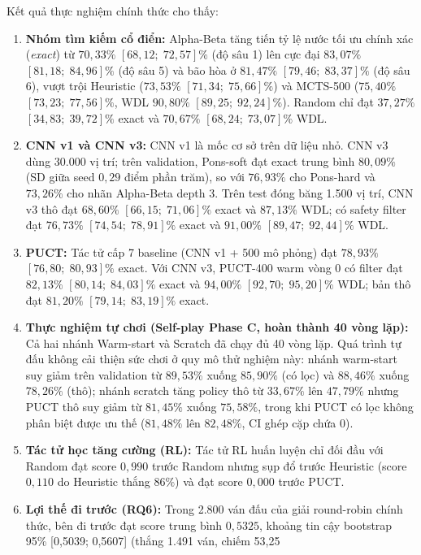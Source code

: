 \documentclass[11pt, a4paper]{article}
\begin{document}
Kết quả thực nghiệm chính thức cho thấy:
\begin{enumerate}
    \item \textbf{Nhóm tìm kiếm cổ điển:} Alpha-Beta tăng tiến tỷ lệ nước tối ưu chính xác (\textit{exact}) từ $70{,}33\%$ $[68{,}12;\; 72{,}57]\%$ (độ sâu 1) lên cực đại $83{,}07\%$ $[81{,}18;\; 84{,}96]\%$ (độ sâu 5) và bão hòa ở $81{,}47\%$ $[79{,}46;\; 83{,}37]\%$ (độ sâu 6), vượt trội Heuristic ($73{,}53\%$ $[71{,}34;\; 75{,}66]\%$) và MCTS-500 ($75{,}40\%$ $[73{,}23;\; 77{,}56]\%$, WDL $90{,}80\%$ $[89{,}25;\; 92{,}24]\%$). Random chỉ đạt $37{,}27\%$ $[34{,}83;\; 39{,}72]\%$ exact và $70{,}67\%$ $[68{,}24;\; 73{,}07]\%$ WDL.
    \item \textbf{CNN v1 và CNN v3:} CNN v1 là mốc cơ sở trên dữ liệu nhỏ. CNN v3 dùng 30.000 vị trí; trên validation, Pons-soft đạt exact trung bình $80{,}09\%$ (SD giữa seed $0{,}29$ điểm phần trăm), so với $76{,}93\%$ cho Pons-hard và $73{,}26\%$ cho nhãn Alpha-Beta depth 3. Trên test đóng băng 1.500 vị trí, CNN v3 thô đạt $68{,}60\%$ $[66{,}15;\; 71{,}06]\%$ exact và $87{,}13\%$ WDL; có safety filter đạt $76{,}73\%$ $[74{,}54;\; 78{,}91]\%$ exact và $91{,}00\%$ $[89{,}47;\; 92{,}44]\%$ WDL.
    \item \textbf{PUCT:} Tác tử cấp 7 baseline (CNN v1 + 500 mô phỏng) đạt $78{,}93\%$ $[76{,}80;\; 80{,}93]\%$ exact. Với CNN v3, PUCT-400 warm vòng 0 có filter đạt $82{,}13\%$ $[80{,}14;\; 84{,}03]\%$ exact và $94{,}00\%$ $[92{,}70;\; 95{,}20]\%$ WDL; bản thô đạt $81{,}20\%$ $[79{,}14;\; 83{,}19]\%$ exact.
    \item \textbf{Thực nghiệm tự chơi (Self-play Phase C, hoàn thành 40 vòng lặp):} Cả hai nhánh Warm-start và Scratch đã chạy đủ 40 vòng lặp. Quá trình tự đấu không cải thiện sức chơi ở quy mô thử nghiệm này: nhánh warm-start suy giảm trên validation từ $89{,}53\%$ xuống $85{,}90\%$ (có lọc) và $88{,}46\%$ xuống $78{,}26\%$ (thô); nhánh scratch tăng policy thô từ $33{,}67\%$ lên $47{,}79\%$ nhưng PUCT thô suy giảm từ $81{,}45\%$ xuống $75{,}58\%$, trong khi PUCT có lọc không phân biệt được ưu thế ($81{,}48\%$ lên $82{,}48\%$, CI ghép cặp chứa 0).
    \item \textbf{Tác tử học tăng cường (RL):} Tác tử RL huấn luyện chỉ đối đầu với Random đạt score $0{,}990$ trước Random nhưng sụp đổ trước Heuristic (score $0{,}110$ do Heuristic thắng $86\%$) và đạt score $0{,}000$ trước PUCT.
    \item \textbf{Lợi thế đi trước (RQ6):} Trong 2.800 ván đấu của giải round-robin chính thức, bên đi trước đạt score trung bình $0{,}5325$, khoảng tin cậy bootstrap 95\% [0,5039; 0,5607] (thắng 1.491 ván, chiếm 53,25%
\end{enumerate}
\end{document}

